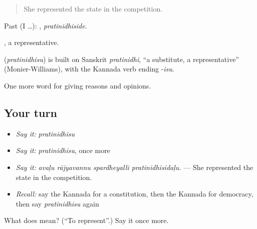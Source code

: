 \begin{quote}
She represented the state in the competition.
\end{quote}

Past (I …): , \emph{pratinidhiside}.

, a representative.

\begin{cousinweb}
\textbf{} (\emph{pratinidhisu}) is built on Sanskrit \emph{pratinidhi}, \textquotedblleft{}a substitute, a representative\textquotedblright{} (Monier-Williams), with the Kannada verb ending -\emph{isu}.
\end{cousinweb}

\begin{grammarlens}[title={What you've built}]
One more word for giving reasons and opinions.
\end{grammarlens}

\subsection*{Your turn}
\begin{itemize}
\raggedright
  \item \emph{Say it:} \emph{pratinidhisu}
  \item \emph{Say it:} \emph{pratinidhisu}, once more
  \item \emph{Say it:} \emph{avaḷu rājyavannu spardheyalli pratinidhisidaḷu.} — She represented the state in the competition.
  \item \emph{Recall:} say the Kannada for a constitution, then the Kannada for democracy, then say \emph{pratinidhisu} again
\end{itemize}

\begin{tcolorbox}[breakable,colback=teal!4,colframe=teal!35!black,title={Before you move on}]
What does  mean? (\textquotedblleft{}To represent\textquotedblright{}.) Say it once more.
\end{tcolorbox}
